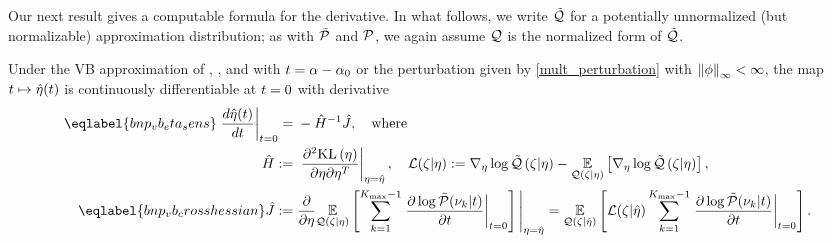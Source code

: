 Our next result gives a computable formula for the derivative. In what follows,
we write $\tilde{\mathcal{Q}}$ for a potentially unnormalized (but normalizable) approximation
distribution; as with $\tilde{\mathcal{P}}$ and $\mathcal{P}$, we again assume $\mathcal{Q}$ is the normalized
form of $\tilde{\mathcal{Q}}$.
%
\begin{thm}
%
%
Under the VB approximation of , , and with
$t = \alpha - \alpha_0$ or the perturbation given by \eqref{mult_perturbation}
with $\left\Vert\phi\right\Vert_{\infty} < \infty$, the map $t \mapsto \hat\eta(t)$ is continuously
differentiable at $t=0$ with derivative
%
\begin{align}
%
\eqlabel{bnp_vb_eta_sens}
\fracat{d \etaopt(\t)}{d \t}{\t=0} ={}&
    - \hessopt^{-1} \crosshessian, \mathwhere \\
%
\hessopt :={}& \fracat{\partial^2 \KL{\eta}}
                      {\partial \eta \partial \eta^T}
                      {\eta = \etaopt},
\quad \lqgradbar{\zeta \vert \eta} :={}
    \lqgrad{\zeta \vert \eta} -
    \expect{\q(\zeta \vert \eta)}{\lqgrad{\zeta \vert \eta}}, \\
%
\eqlabel{bnp_vb_crosshessian}
\crosshessian :={}&
    \frac{\partial}{\partial\eta}
    \expect{\q(\zeta \vert \eta)}{
        \sum_{k=1}^{\kmax-1}
        \fracat{\partial \log \ptil(\nu_k \vert \t)}
                {\partial \t}{\t=0}
    }
    \Bigg|_{\eta = \etaopt}
={}
    \expect{\q(\zeta \vert \etaopt)}{
          \lqgradbar{\zeta \vert \etaopt}
          \sum_{k=1}^{\kmax-1}
          \fracat{\partial \log \ptil(\nu_k \vert \t)}
                 {\partial \t}{\t=0}}.
%
\end{align}
%
%
\end{thm}
